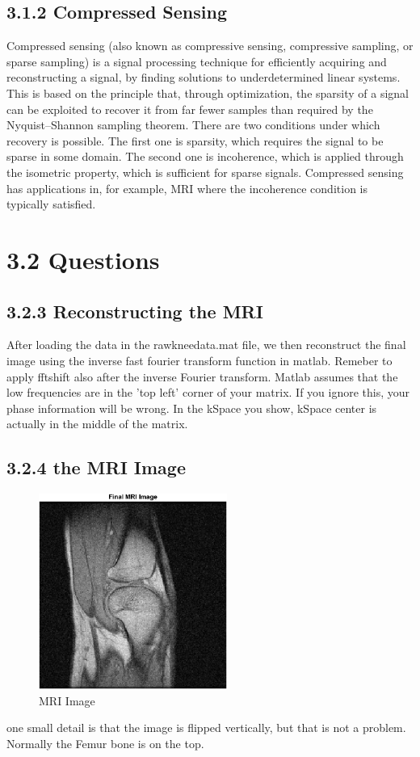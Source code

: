 \documentclass[12pt,fleqn]{article}
\begin{document}
\subsection{3.1.2 Compressed Sensing}
Compressed sensing (also known as compressive sensing, compressive sampling, or sparse sampling) is a signal processing technique for efficiently acquiring and reconstructing a signal, by finding solutions to underdetermined linear systems. This is based on the principle that, through optimization, the sparsity of a signal can be exploited to recover it from far fewer samples than required by the Nyquist–Shannon sampling theorem. There are two conditions under which recovery is possible. The first one is sparsity, which requires the signal to be sparse in some domain. The second one is incoherence, which is applied through the isometric property, which is sufficient for sparse signals. Compressed sensing has applications in, for example, MRI where the incoherence condition is typically satisfied.
\section{3.2 Questions}
\subsection{3.2.3 Reconstructing the MRI}
After loading the data in the rawkneedata.mat file, we then reconstruct the final image using the inverse fast fourier transform function in matlab.
Remeber to apply fftshift also after the inverse Fourier transform. Matlab assumes that the low frequencies are in the 'top left' corner of your matrix. If you ignore this, your phase information will be wrong. In the kSpace you show, kSpace center is actually in the middle of the matrix.
\subsection{3.2.4 the MRI Image}
\begin{figure}[H]
    \centering
    \includegraphics[width=0.55\textwidth]{knee_mri.png}
    \caption{MRI Image}
    \label{fig:2.3.3}
\end{figure}
one small detail is that the image is flipped vertically, but that is not a problem. Normally the Femur bone is on the top.
\end{document}

